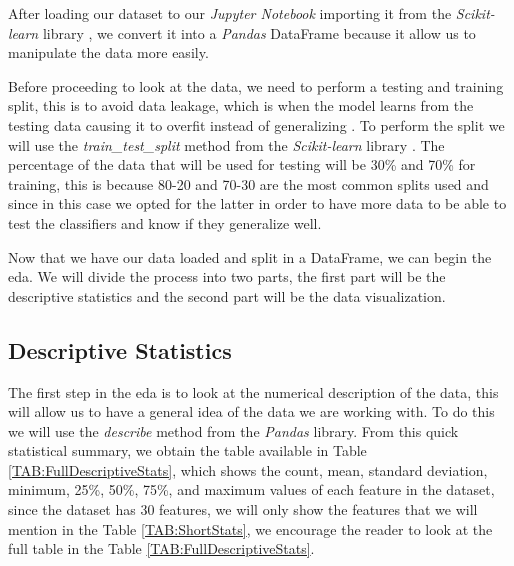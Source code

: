 After loading our dataset \cite{william_wolberg_breast_1993} to our \textit{Jupyter Notebook} importing it from the \textit{Scikit-learn} library \cite{scikit_learn_sklearndatasetsload_breast_cancer_nodate}, we convert it into a \textit{Pandas}\cite{team_pandas-devpandas_2020} DataFrame because it allow us to manipulate the data more easily.

Before proceeding to look at the data, we need to perform a testing and training split, this is to avoid data leakage, which is when the model learns from the testing data causing it to overfit instead of generalizing \cite{wang_machine_2020}. To perform the split we will use the \textit{train\_test\_split} method from the \textit{Scikit-learn} library \cite{pedregosa_scikit-learn_2011}. The percentage of the data that will be used for testing will be 30\% and 70\% for training, this is because 80-20 and 70-30 are the most common splits used \cite{racz_effect_2021} and since in this case we opted for the latter in order to have more data to be able to test the classifiers and know if they generalize well.

Now that we have our data loaded and split in a DataFrame, we can begin the \ac{eda}. We will divide the process into two parts, the first part will be the descriptive statistics and the second part will be the data visualization.

\subsection{Descriptive Statistics}

The first step in the \ac{eda} is to look at the numerical description of the data, this will allow us to have a general idea of the data we are working with. To do this we will use the \textit{describe} method from the \textit{Pandas} library. From this quick statistical summary, we obtain the table available in Table \ref{TAB:FullDescriptiveStats}, which shows the count, mean, standard deviation, minimum, 25\%, 50\%, 75\%, and maximum values of each feature in the dataset, since the dataset has 30 features, we will only show the features that we will mention in the Table \ref{TAB:ShortStats}, we encourage the reader to look at the full table in the Table \ref{TAB:FullDescriptiveStats}.


